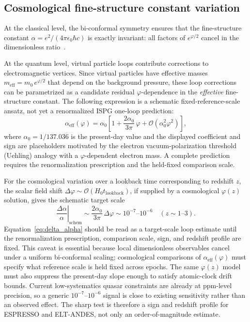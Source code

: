 \documentclass[aps,prd,onecolumn,superscriptaddress,nofootinbib,showpacs,12pt,notitlepage]{revtex4-2}
\newcommand{\meff}{m_{\mathrm{eff}}}
\renewcommand{\order}[1]{\mathcal{O}\!\left(#1\right)}
\begin{document}
\subsection{Cosmological fine-structure constant variation}
\label{sec:alpha_var}

At the classical level, the bi-conformal symmetry ensures
that the fine-structure constant $\alpha = e^2/(4\pi\epsilon_0
\hbar c)$ is exactly invariant: all factors of $e^{\varphi/2}$
cancel in the dimensionless ratio~\cite{Lotishvili2026}.

At the quantum level, virtual particle loops contribute
corrections to electromagnetic vertices.  Since virtual
particles have effective masses $\meff = m_0\,e^{\varphi/2}$
that depend on the background pressure, these loop corrections
can be parametrized as a candidate residual
$\varphi$-dependence in the \emph{effective} fine-structure
constant.  The following expression is a schematic
fixed-reference-scale ansatz, not yet a renormalized ISPG
one-loop prediction:
\begin{equation}\label{eq:alpha_eff}
  \alpha_{\mathrm{eff}}(\varphi)
  = \alpha_0\left[1
    + \frac{2\alpha_0}{3\pi}\,\varphi
    + \order{\alpha_0^{2}\varphi^{2}}\right],
\end{equation}
where $\alpha_0 = 1/137.036$ is the present-day value
and the displayed coefficient and sign are placeholders
motivated by the electron vacuum-polarization threshold
(Uehling) analogy with a $\varphi$-dependent electron mass.
A complete prediction requires the renormalization prescription
and the held-fixed comparison scale.

For the cosmological variation over a lookback time
corresponding to redshift $z$, the scalar field shift
$\Delta\varphi \sim \order{H_0 t_{\mathrm{lookback}}}$,
if supplied by a cosmological $\varphi(z)$ solution, gives the
schematic target scale
\begin{equation}\label{eq:delta_alpha}
  \left.\frac{\Delta\alpha}{\alpha}\right|_{\mathrm{schem}}
  \sim \frac{2\alpha_0}{3\pi}\,\Delta\varphi
  \sim 10^{-7}\text{--}10^{-6}
  \quad (z \sim 1\text{--}3).
\end{equation}
Equation~\eqref{eq:delta_alpha} should be read as a
target-scale loop estimate until the renormalization
prescription, comparison scale, sign, and redshift profile are
fixed.  This caveat is essential
because local dimensionless observables cancel under a uniform
bi-conformal scaling; cosmological comparisons of
$\alpha_{\mathrm{eff}}(\varphi)$ must specify what reference
scale is held fixed across epochs.  The same $\varphi(z)$ model
must also suppress the present-day slope enough to satisfy
atomic-clock drift bounds.  Current low-systematics quasar
constraints are already at ppm-level precision, so a generic
$10^{-7}$--$10^{-6}$ signal is close to existing sensitivity
rather than an observed effect.  The sharp test is therefore a
sign and redshift profile for ESPRESSO and ELT-ANDES, not only
an order-of-magnitude estimate.
\end{document}
